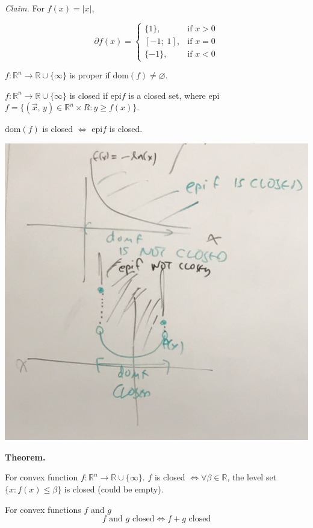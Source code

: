 \documentclass{article}
\newcommand{\R}{\mathbb{R}}             %
\newcommand{\dom}{\text{dom}}           %
\begin{document}
\textit{Claim.} For $f(x) = |x|$,

\[
    \partial f(x) = \begin{cases}
        \{1\}, & \text{if } x > 0 \\
        [-1;\; 1], & \text{if } x = 0 \\
        \{-1\}, & \text{if } x < 0
    \end{cases}
\]


$f \colon \R^n \to \R \cup \{\infty\}$ is proper if $\dom(f) \neq \varnothing$.

$f \colon \R^n \to \R \cup \{\infty\}$ is closed if epi$f$ is a closed set, where epi$f = \{(\vec{x},\, y) \in \R^n \times R: y \geq f(x)\}$.

$\dom(f)$ is closed $\iff$ epi$f$ is closed.

\begin{center}
    \includegraphics[scale=0.1]{epif.JPG}
\end{center}

\textbf{Theorem.}

For convex function $f \colon \R^n \to \R \cup \{\infty\}$. $f$ is closed $\iff \forall \beta \in \R$, the level set $\{x : f(x) \leq \beta\}$ is closed (could be empty).

For convex functions $f$ and $g$
\[
    f \text{ and } g \text{ closed} \iff f + g \text{ closed}
\]
\end{document}
